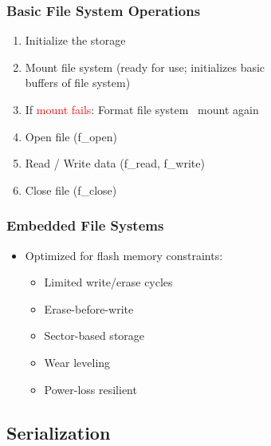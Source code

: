  \begin{minipage}[t]{0.55\linewidth}
    \subsubsection{Basic File System Operations}
      \begin{enumerate}
        \item Initialize the storage
        \item Mount file system (ready for use; initializes basic\\ buffers of file system)
        \item If \textcolor{red}{mount fails}: Format file system \textrightarrow\ mount again
        \item Open file (f\_open)
        \item Read / Write data (f\_read, f\_write)
        \item Close file (f\_close)
      \end{enumerate}
  \end{minipage}\hfill
  \begin{minipage}[t]{0.46\linewidth}
    \subsubsection{Embedded File Systems}
      \begin{itemize}
        \item Optimized for flash memory constraints:
        \begin{itemize}
          \item Limited write/erase cycles
          \item Erase-before-write
          \item Sector-based storage
          \item Wear leveling
          \item Power-loss resilient
        \end{itemize}
      \end{itemize}
    \end{minipage}

\subsection{Serialization}

